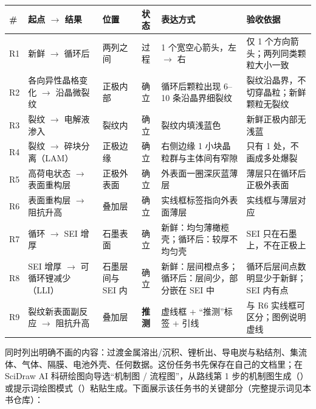 \begin{center}\scriptsize
\setlength{\tabcolsep}{2.5pt}
\renewcommand{\arraystretch}{1.12}
\begin{tabularx}{\linewidth}{@{}l>{\raggedright\arraybackslash}p{22mm}>{\raggedright\arraybackslash}p{16mm}>{\raggedright\arraybackslash}p{12mm}YY@{}}
\toprule
\textbf{\#} & \textbf{起点 \ensuremath{\rightarrow} 结果} & \textbf{位置} & \textbf{状态} & \textbf{表达方式} & \textbf{验收依据} \\
\midrule
R1 & 新鲜 \ensuremath{\rightarrow} 循环后 & 两列之间 & 过程 & 1 个宽空心箭头，左 \ensuremath{\rightarrow} 右 & 仅 1 个方向箭头；两列同类颗粒大小一致 \\
R2 & 各向异性晶格变化 \ensuremath{\rightarrow} 沿晶微裂纹 & 正极内部 & 确立 & 循环后颗粒出现 6--10 条沿晶界细裂纹 & 裂纹沿晶界，不切穿晶粒；新鲜颗粒无裂纹 \\
R3 & 裂纹 \ensuremath{\rightarrow} 电解液渗入 & 裂纹内 & 确立 & 裂纹内填浅蓝色 & 新鲜正极内部无浅蓝 \\
R4 & 裂纹 \ensuremath{\rightarrow} 碎块分离（LAM） & 正极边缘 & 确立 & 右侧边缘 1 小块晶粒群与主体间有窄隙 & 只有 1 处，不画成多处爆裂 \\
R5 & 高荷电状态 \ensuremath{\rightarrow} 表面重构层 & 正极外表面 & 确立 & 外表面一圈深灰蓝薄层 & 薄层只在循环后正极外表面 \\
R6 & 表面重构层 \ensuremath{\rightarrow} 阻抗升高 & 叠加层 & 确立 & 实线框标签指向外表面薄层 & 实线框与薄层对应 \\
R7 & 循环 \ensuremath{\rightarrow} SEI 增厚 & 石墨表面 & 确立 & 新鲜：均匀薄橄榄壳；循环后：较厚不均匀壳 & SEI 只在石墨上，不在正极上 \\
R8 & SEI 增厚 \ensuremath{\rightarrow} 可循环锂减少（LLI） & 石墨层间与 SEI 内 & 确立 & 新鲜：层间橙点多；循环后：层间少，部分嵌在 SEI 中 & 循环后层间点数明显少于新鲜；SEI 内有点 \\
R9 & 裂纹新表面副反应 \ensuremath{\rightarrow} 阻抗升高 & 叠加层 & \textbf{推测} & 虚线框 + “推测”标签 + 引线 & 与 R6 实线框可区分；图例说明虚线 \\
\bottomrule
\end{tabularx}
\end{center}

同时列出明确不画的内容：过渡金属溶出/沉积、锂析出、导电炭与粘结剂、集流体、气体、隔膜、电池外壳、任何数据。这份任务书先保存在自己的文档里；在 SciDraw AI 科研绘图向导选“机制图 / 流程图”，从路线第 1 步的机制图生成（）或提示词绘图模式（）粘贴生成。下面展示该任务书的关键部分（完整提示词见本书仓库）：

